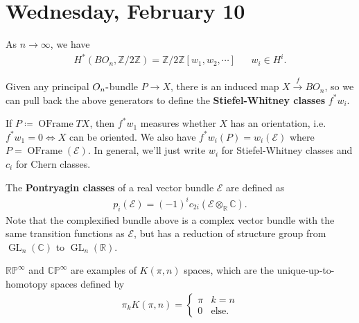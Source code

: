 \hypertarget{wednesday-february-10}{%
\section{Wednesday, February 10}\label{wednesday-february-10}}

\begin{theorem}[?]

As \(n\to \infty\), we have
\begin{align*}
H^*(BO_n, {\mathbb{Z}}/2{\mathbb{Z}}) = {\mathbb{Z}}/2{\mathbb{Z}}[w_1, w_2, \cdots]
&& w_i \in H^i
.\end{align*}

\end{theorem}

\begin{definition}[?]

Given any principal \(O_n{\hbox{-}}\)bundle \(P\to X\), there is an
induced map \(X \xrightarrow{f} BO_n\), so we can pull back the above
generators to define the \textbf{Stiefel-Whitney classes} \(f^* w_i\).

\end{definition}

\begin{remark}

If \(P \coloneqq{\operatorname{OFrame}}TX\), then \(f^* w_1\) measures
whether \(X\) has an orientation, i.e.~\(f^* w_1 = 0 \iff X\) can be
oriented. We also have \(f^* w_i(P) = w_i( \mathcal{E} )\) where
\(P = {\operatorname{OFrame}}( \mathcal{E} )\). In general, we'll just
write \(w_i\) for Stiefel-Whitney classes and \(c_i\) for Chern classes.

\end{remark}

\begin{definition}

The \textbf{Pontryagin classes} of a real vector bundle \(\mathcal{E}\)
are defined as
\begin{align*}
p_i( \mathcal{E} ) = (-1)^i c_{2i}( \mathcal{E} \otimes_{\mathbb{R}}{\mathbb{C}})
.\end{align*}
Note that the complexified bundle above is a complex vector bundle with
the same transition functions as \(\mathcal{E}\), but has a reduction of
structure group from \(\operatorname{GL}_n({\mathbb{C}})\) to
\(\operatorname{GL}_n({\mathbb{R}})\).

\end{definition}

\begin{observation}

\({\mathbb{RP}}^{\infty }\) and \({\mathbb{CP}}^{\infty }\) are examples
of \(K(\pi, n)\) spaces, which are the unique-up-to-homotopy spaces
defined by
\begin{align*}
\pi_k K (\pi, n) = 
\begin{cases}
\pi &  k=n
\\
0 & \text{else}.
\end{cases}
\end{align*}

\end{observation}

